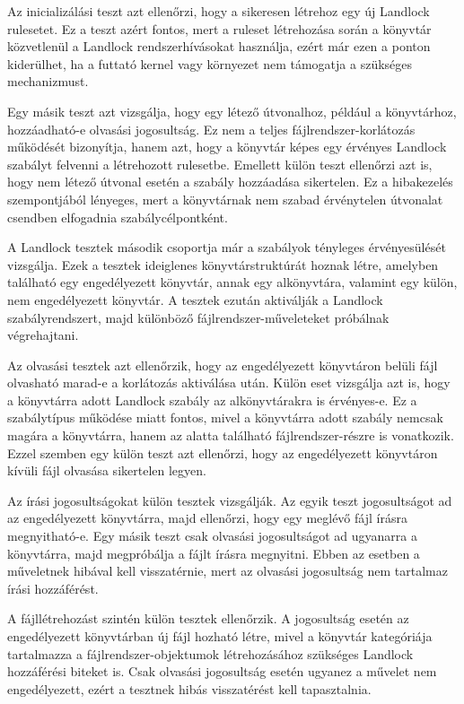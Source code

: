 Az inicializálási teszt azt ellenőrzi, hogy a
 sikeresen létrehoz egy új Landlock
rulesetet. Ez a teszt azért fontos, mert a ruleset létrehozása során a könyvtár
közvetlenül a Landlock rendszerhívásokat használja, ezért már ezen a ponton
kiderülhet, ha a futtató kernel vagy környezet nem támogatja a szükséges
mechanizmust.

Egy másik teszt azt vizsgálja, hogy egy létező útvonalhoz, például a
 könyvtárhoz, hozzáadható-e olvasási jogosultság. Ez nem a teljes
fájlrendszer-korlátozás működését bizonyítja, hanem azt, hogy a könyvtár képes
egy érvényes Landlock szabályt felvenni a létrehozott rulesetbe. Emellett külön
teszt ellenőrzi azt is, hogy nem létező útvonal esetén a szabály hozzáadása
sikertelen. Ez a hibakezelés szempontjából lényeges, mert a könyvtárnak nem
szabad érvénytelen útvonalat csendben elfogadnia szabálycélpontként.

A Landlock tesztek második csoportja már a szabályok tényleges
érvényesülését vizsgálja. Ezek a tesztek ideiglenes könyvtárstruktúrát hoznak
létre, amelyben található egy engedélyezett könyvtár, annak egy alkönyvtára,
valamint egy külön, nem engedélyezett könyvtár. A tesztek ezután aktiválják a
Landlock szabályrendszert, majd különböző fájlrendszer-műveleteket próbálnak
végrehajtani.

Az olvasási tesztek azt ellenőrzik, hogy az engedélyezett könyvtáron belüli
fájl olvasható marad-e a korlátozás aktiválása után. Külön eset vizsgálja azt
is, hogy a könyvtárra adott Landlock szabály az alkönyvtárakra is érvényes-e.
Ez a 
szabálytípus működése miatt fontos, mivel a könyvtárra adott szabály nemcsak
magára a könyvtárra, hanem az alatta található fájlrendszer-részre is
vonatkozik. Ezzel szemben egy külön teszt azt ellenőrzi, hogy az engedélyezett
könyvtáron kívüli fájl olvasása sikertelen legyen.

Az írási jogosultságokat külön tesztek vizsgálják. Az egyik teszt
 jogosultságot ad az engedélyezett könyvtárra, majd ellenőrzi,
hogy egy meglévő fájl írásra megnyitható-e. Egy másik teszt csak olvasási
jogosultságot ad ugyanarra a könyvtárra, majd megpróbálja a fájlt írásra
megnyitni. Ebben az esetben a műveletnek hibával kell visszatérnie, mert az
olvasási jogosultság nem tartalmaz írási hozzáférést.

A fájllétrehozást szintén külön tesztek ellenőrzik. A 
jogosultság esetén az engedélyezett könyvtárban új fájl hozható létre, mivel a
könyvtár  kategóriája tartalmazza a fájlrendszer-objektumok
létrehozásához szükséges Landlock hozzáférési biteket is. Csak olvasási
jogosultság esetén ugyanez a művelet nem engedélyezett, ezért a tesztnek
hibás visszatérést kell tapasztalnia.

